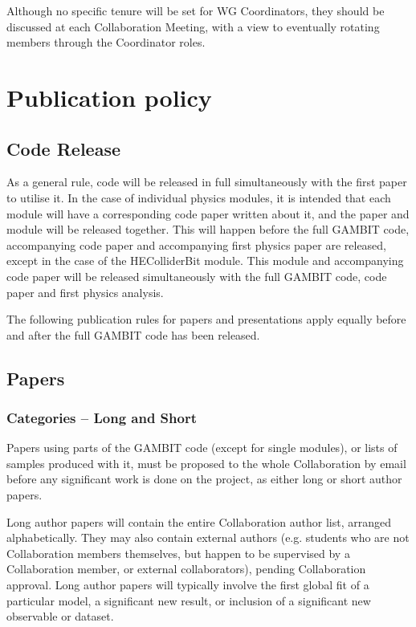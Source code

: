 Although no specific tenure will be set for WG Coordinators, they should be discussed at each Collaboration Meeting, with a view to eventually rotating members through the Coordinator roles.

\section{Publication policy}

\subsection{Code Release}

As a general rule, code will be released in full simultaneously with the first paper to utilise it.  In the case of individual physics modules, it is intended that each module will have a corresponding code paper written about it, and the paper and module will be released together.  This will happen before the full GAMBIT code, accompanying code paper and accompanying first physics paper are released, except in the case of the HEColliderBit module.  This module and accompanying code paper will be released simultaneously with the full GAMBIT code, code paper and first physics analysis.

The following publication rules for papers and presentations apply equally before and after the full GAMBIT code has been released.

\subsection{Papers}

\subsubsection{Categories -- Long and Short}

Papers using parts of the GAMBIT code (except for single modules), or lists of samples produced with it, must be proposed to the whole Collaboration by email before any significant work is done on the project, as either long or short author papers.  

Long author papers will contain the entire Collaboration author list, arranged alphabetically.  They may also contain external authors (e.g. students who are not Collaboration members themselves, but happen to be supervised by a Collaboration member, or external collaborators), pending Collaboration approval.  Long author papers will typically involve the first global fit of a particular model, a significant new result, or inclusion of a significant new observable or dataset.

